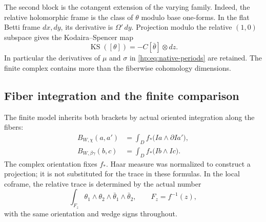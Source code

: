 The second block is the cotangent extension of the varying family.
Indeed, the relative holomorphic frame is the class of $\theta$
modulo base one-forms. In the flat Betti frame $dx,dy$, its
derivative is $\Omega'\,dy$. Projection modulo the relative
$(1,0)$ subspace gives the Kodaira--Spencer map
\begin{equation}\label{hp:eq:KS}
 \operatorname{KS}([\theta])=-C[\bar\theta]\otimes dz.
\end{equation}
In particular the derivatives of $\mu$ and $\sigma$ in
\eqref{hp:eq:native-periods} are retained. The finite complex
contains more than the fiberwise cohomology dimensions.

\subsection{Fiber integration and the finite comparison}
\label{hp:subsec:comparison}

The finite model inherits both brackets by actual oriented
integration along the fibers:
\begin{equation}\label{hp:eq:finite-brackets}
\begin{aligned}
 B_{W,\chi}(a,a')&=\int_D f_*
                   \bigl(Ia\wedge\partial Ia'\bigr),\\
 B_{W,\beta\gamma}(b,c)&=\int_D f_*
                   \bigl(Ib\wedge Ic\bigr).
\end{aligned}
\end{equation}
The complex orientation fixes $f_*$. Haar measure was normalized to
construct a projection; it is not substituted for the trace in
these formulas. In the local coframe, the relative trace is
determined by the actual number
\[
 \int_{F_z}\theta_1\wedge\theta_2
                    \wedge\bar\theta_1\wedge\bar\theta_2,
 \qquad F_z=f^{-1}(z),
\]
with the same orientation and wedge signs throughout.

